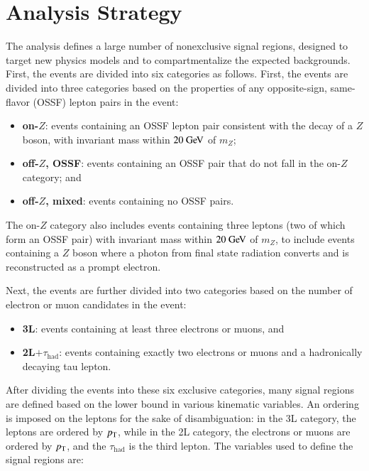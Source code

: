 \section{Analysis Strategy}\label{sec:model-independent-analysis-strategy}
The analysis defines a large number of nonexclusive signal regions, designed to target new physics models and to compartmentalize the expected backgrounds. First, the events are divided into six categories as follows. First, the events are divided into three categories based on the properties of any opposite-sign, same-flavor (OSSF) lepton pairs in the event:

\begin{itemize}
	\item \textbf{on-$Z$}: events containing an OSSF lepton pair consistent with the decay of a $Z$ boson, with invariant mass within $20 \GeV$ of $m_Z$;
	\item \textbf{off-$Z$, OSSF}:  events containing an OSSF pair that do not fall in the on-$Z$ category; and
	\item \textbf{off-$Z$, mixed}: events containing no OSSF pairs.
\end{itemize}

The on-$Z$ category also includes events containing three leptons (two of which form an OSSF pair) with invariant mass within $20 \GeV$ of $m_Z$, to include events containing a $Z$ boson where a photon from final state radiation converts and is reconstructed as a prompt electron.

Next, the events are further divided into two categories based on the number of electron or muon candidates in the event:

\begin{itemize}
	\item \textbf{3L}: events containing at least three electrons or muons, and
	\item \textbf{2L$+\tau_{\mathrm{had}}$}: events containing exactly two electrons or muons and a hadronically decaying tau lepton.
\end{itemize}

After dividing the events into these six exclusive categories, many signal regions are defined based on the lower bound in various kinematic variables. An ordering is imposed on the leptons for the sake of disambiguation: in the 3L category, the leptons are ordered by $p_{\text{T}}$, while in the 2L category, the electrons or muons are ordered by $p_{\text{T}}$, and the $\tau_{\mathrm{had}}$ is the third lepton.  The variables used to define the signal regions are:

